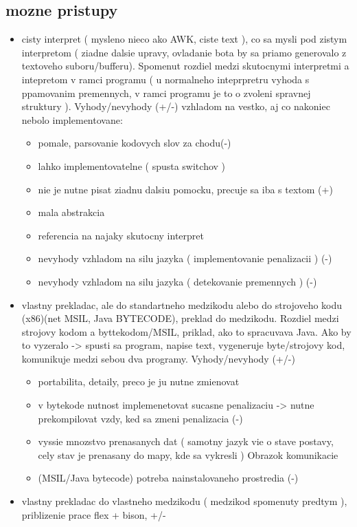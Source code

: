 \documentclass[a4paper,11pt,final]{report}
\begin{document}
\subsection{mozne pristupy}
\begin{itemize}
\item cisty interpret ( mysleno nieco ako AWK, ciste text ), co sa mysli pod zistym interpretom ( ziadne dalsie upravy, ovladanie bota by sa priamo generovalo z textoveho suboru/bufferu). Spomenut rozdiel medzi skutocnymi interpretmi a intepretom v ramci programu ( u normalneho inteprpretru vyhoda s ppamovanim premennych, v ramci programu je to o zvoleni spravnej struktury ). Vyhody/nevyhody (+/-) vzhladom na vestko, aj co nakoniec nebolo implementovane:
\begin{itemize}
\item pomale, parsovanie kodovych slov za chodu(-)
\item lahko implementovatelne ( spusta switchov )
\item nie je nutne pisat ziadnu dalsiu pomocku, precuje sa iba s textom (+)
\item mala abstrakcia
\item referencia na najaky skutocny interpret
\item nevyhody vzhladom na silu jazyka ( implementovanie penalizacii ) (-)
\item nevyhody vzhladom na silu jazyka ( detekovanie premennych ) (-)
\end{itemize}
\item vlastny prekladac, ale do standartneho medzikodu alebo do strojoveho kodu (x86)(net MSIL, Java BYTECODE), preklad do medzikodu. Rozdiel medzi strojovy kodom a byttekodom/MSIL, priklad, ako to spracuvava Java. Ako by to vyzeralo -> spusti sa program, napise text, vygeneruje byte/strojovy kod, komunikuje medzi sebou dva programy.  Vyhody/nevyhody (+/-)
\begin{itemize}
\item portabilita, detaily, preco je ju nutne zmienovat 
\item v bytekode nutnost implemenetovat sucasne penalizaciu -> nutne prekompilovat vzdy, ked sa zmeni penalizacia (-) 
\item vyssie mnozstvo prenasanych dat ( samotny jazyk vie o stave postavy, cely stav je prenasany do mapy, kde sa vykresli ) Obrazok komunikacie
\item (MSIL/Java bytecode) potreba nainstalovaneho prostredia (-)
\end{itemize}
\item vlastny prekladac do vlastneho medzikodu ( medzikod spomenuty predtym ), priblizenie prace flex + bison, +/-

\end{itemize}
\end{document}
